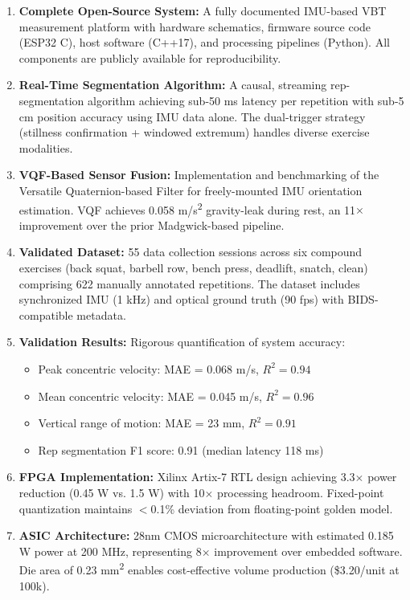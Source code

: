 \begin{enumerate}
    \item \textbf{Complete Open-Source System:} A fully documented IMU-based VBT measurement platform with hardware schematics, firmware source code (ESP32 C), host software (C++17), and processing pipelines (Python). All components are publicly available for reproducibility.

    \item \textbf{Real-Time Segmentation Algorithm:} A causal, streaming rep-segmentation algorithm achieving sub-50 ms latency per repetition with sub-5 cm position accuracy using IMU data alone. The dual-trigger strategy (stillness confirmation + windowed extremum) handles diverse exercise modalities.

    \item \textbf{VQF-Based Sensor Fusion:} Implementation and benchmarking of the Versatile Quaternion-based Filter for freely-mounted IMU orientation estimation. VQF achieves 0.058 m/s\textsuperscript{2} gravity-leak during rest, an 11$\times$ improvement over the prior Madgwick-based pipeline.

    \item \textbf{Validated Dataset:} 55 data collection sessions across six compound exercises (back squat, barbell row, bench press, deadlift, snatch, clean) comprising 622 manually annotated repetitions. The dataset includes synchronized IMU (1 kHz) and optical ground truth (90 fps) with BIDS-compatible metadata.

    \item \textbf{Validation Results:} Rigorous quantification of system accuracy:
    \begin{itemize}
        \item Peak concentric velocity: MAE = 0.068 m/s, $R^2 = 0.94$
        \item Mean concentric velocity: MAE = 0.045 m/s, $R^2 = 0.96$
        \item Vertical range of motion: MAE = 23 mm, $R^2 = 0.91$
        \item Rep segmentation F1 score: 0.91 (median latency 118 ms)
    \end{itemize}

    \item \textbf{FPGA Implementation:} Xilinx Artix-7 RTL design achieving 3.3$\times$ power reduction (0.45 W vs. 1.5 W) with 10$\times$ processing headroom. Fixed-point quantization maintains $<$0.1\% deviation from floating-point golden model.

    \item \textbf{ASIC Architecture:} 28nm CMOS microarchitecture with estimated 0.185 W power at 200 MHz, representing 8$\times$ improvement over embedded software. Die area of 0.23 mm\textsuperscript{2} enables cost-effective volume production (\$3.20/unit at 100k).
\end{enumerate}

